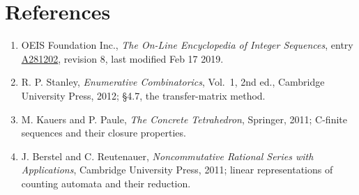 \documentclass[11pt]{article}
\theoremstyle{definition}
\begin{document}
\section{References}

\begin{enumerate}

\item OEIS Foundation Inc., \emph{The On-Line Encyclopedia of Integer Sequences}, entry \href{https://oeis.org/A281202}{A281202}, revision 8, last modified Feb 17 2019.

\item R. P. Stanley, \emph{Enumerative Combinatorics}, Vol.~1, 2nd ed., Cambridge University Press, 2012; \S4.7, the transfer-matrix method.

\item M. Kauers and P. Paule, \emph{The Concrete Tetrahedron}, Springer, 2011; C-finite sequences and their closure properties.

\item J. Berstel and C. Reutenauer, \emph{Noncommutative Rational Series with Applications}, Cambridge University Press, 2011; linear representations of counting automata and their reduction.

\end{enumerate}
\end{document}
